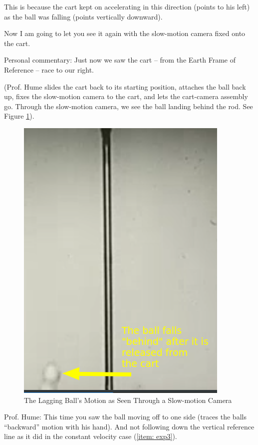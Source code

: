 \documentclass[a6paper]{article}
\newcommand{\perscom}[1]{
    {\footnotesize Personal commentary:  #1}
}
\begin{document}
This is because the cart kept on accelerating in this direction (points to his left) as the ball was falling (points vertically downward).

Now I am going to let you see it again with the slow-motion camera fixed onto the cart.

\perscom{ Just now we saw the cart -- from the Earth Frame of Reference -- race to our right. }

(Prof. Hume slides the cart back to its starting position, attaches the ball back up, fixes the slow-motion camera to the cart, and lets the cart-camera assembly go. Through the slow-motion camera, we see the ball landing behind the rod. See Figure \ref{fig: detached-ball-lands-behind-an-accelerating-cart}).

\begin{figure}
    \centering
    \includegraphics[width=0.7\linewidth]{detached-ball-lands-behind-an-accelerating-cart.png}
    \caption{The Lagging Ball's Motion as Seen Through a Slow-motion Camera}
    \label{fig: detached-ball-lands-behind-an-accelerating-cart}
\end{figure}

Prof. Hume: This time you saw the ball moving off to one side (traces the balls ``backward'' motion with his hand). And not following down the vertical reference line as it did in the constant velocity case (\ref{item: exp3}).
\end{document}
